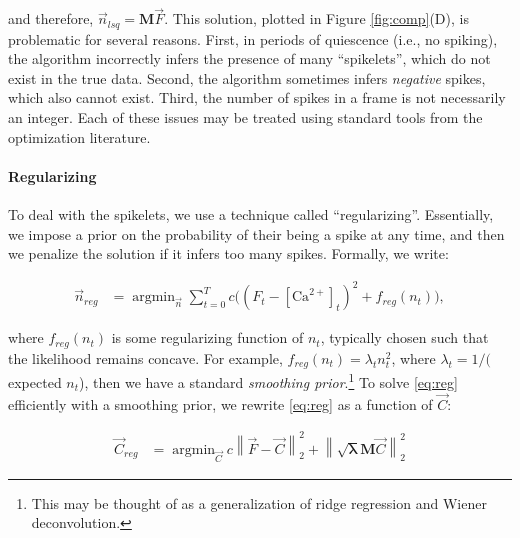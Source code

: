 \documentclass[12pt]{article}
\providecommand{\ve}[1]{\vec{#1}}
\providecommand{\ma}[1]{\boldsymbol{#1}}
\providecommand{\norm}[1]{\left \lVert#1 \right  \rVert}
\providecommand{\ve}[1]{\boldsymbol{#1}}
\DeclareMathOperator*{\argmin}{argmin}
\newcommand{\Lik}{\mathcal{L}}
\newcommand{\Ca}{[\text{Ca}^{2+}]}
\newcommand{\Cav}{\ve{C}}%
\newcommand{\sml}{\sqrt{\ma{\lambda}}}
\begin{document}
\noindent and therefore, $\ve{n}_{lsq}=\ma{M}\ve{F}$.
This solution, plotted in Figure \ref{fig:comp}(D), is problematic for several reasons. First, in periods of quiescence (i.e., no spiking), the algorithm incorrectly infers the presence of many ``spikelets'', which do not exist in the true data.  Second, the algorithm sometimes infers \emph{negative} spikes, which also cannot exist. Third, the number of spikes in a frame is not necessarily an integer.  Each of these issues may be treated using standard tools from the optimization literature.

\paragraph{Regularizing}

To deal with the spikelets, we use a technique called ``regularizing''.  Essentially, we impose a prior on the probability of their being a spike at any time, and then we penalize the solution if it infers too many spikes.  Formally, we write:

\begin{align} \label{eq:reg}
\ve{n}_{reg} &= \argmin_{\ve{n}} \sum_{t=0}^T c \big((F_t - \Ca_t)^2 + f_{reg}(n_t) \big),
\end{align}

\noindent where $f_{reg}(n_t)$ is some regularizing function of $n_t$, typically chosen such that the likelihood remains concave.  For example, $f_{reg}(n_t)=\lambda_t n_t^2$, where $\lambda_t=1/($expected $n_t$), then we have a standard \emph{smoothing prior}.\footnote{This may be thought of as a generalization of ridge regression and Wiener deconvolution.}  To solve \eqref{eq:reg} efficiently with a smoothing prior, we rewrite \eqref{eq:reg} as a function of $\Cav$:

\begin{align} \label{eq:reg2}
\Cav_{reg} &= \argmin_{\Cav} c\norm{\ve{F}-\Cav}_2^2 + \norm{\sml\ma{M}\Cav}_2^2
\end{align}
\end{document}
